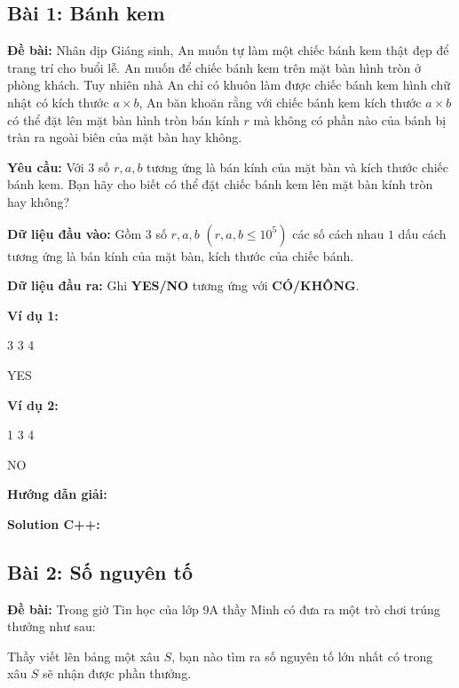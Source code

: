 \documentclass[12pt]{scrartcl}  %
\begin{document}
\subsection{Bài 1: Bánh kem}
\textbf{Đề bài:}
Nhân dịp Giáng sinh, An muốn tự làm một chiếc bánh kem thật đẹp để trang trí cho buổi lễ. 
An muốn để chiếc bánh kem trên mặt bàn hình tròn ở phòng khách. Tuy nhiên nhà An chỉ có khuôn
làm được chiếc bánh kem hình chữ nhật có kích thước $a \times b$, An băn khoăn rằng với chiếc
bánh kem kích thước $a \times b$ có thể đặt lên mặt bàn hình tròn bán kính $r$ mà không có
phần nào của bánh bị tràn ra ngoài biên của mặt bàn hay không.

\textbf{Yêu cầu:}
Với $3$ số $r, a, b$ tương ứng là bán kính của mặt bàn và kích thước chiếc bánh kem. Bạn hãy cho biết có thể đặt chiếc bánh kem lên mặt bàn kính tròn hay không?


\textbf{Dữ liệu đầu vào:}
Gồm $3$ số $r, a, b$ $(r, a, b \leq 10^5)$ các số cách nhau $1$ dấu cách tương ứng là bán kính của mặt bàn, kích thước của chiếc bánh.

\textbf{Dữ liệu đầu ra:}
Ghi \textbf{YES/NO} tương ứng với \textbf{CÓ/KHÔNG}.

\textbf{Ví dụ 1:}
\begin{tcolorbox}[colback=gray!5!white, colframe=blue!50!black, title=Input]
3 3 4
\end{tcolorbox}
\begin{tcolorbox}[colback=gray!5!white, colframe=green!50!black, title=Output]
YES
\end{tcolorbox}

\textbf{Ví dụ 2:}
\begin{tcolorbox}[colback=gray!5!white, colframe=blue!50!black, title=Input]
1 3 4
\end{tcolorbox}
\begin{tcolorbox}[colback=gray!5!white, colframe=green!50!black, title=Output]
NO
\end{tcolorbox}

\textbf{Hướng dẫn giải:}

\textbf{Solution C++:}

\subsection{Bài 2: Số nguyên tố}
\textbf{Đề bài:}
Trong giờ Tin học của lớp 9A thầy Minh có đưa ra một trò chơi trúng thưởng như sau:

Thầy viết lên bảng một xâu $S$, bạn nào tìm ra số nguyên tố lớn nhất có trong xâu $S$ sẽ nhận được phần thưởng.
\end{document}
